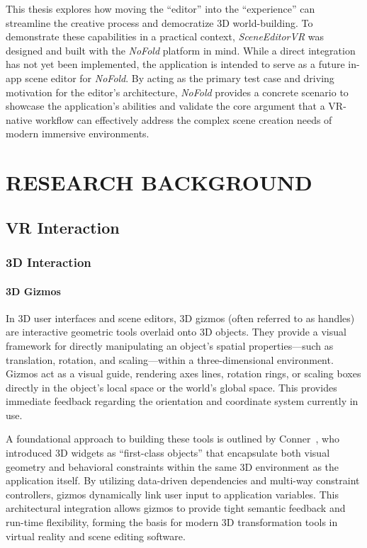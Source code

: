 \documentclass[inscr,ack,preface]{dithesis}
\begin{document}
This thesis explores how moving the ``editor'' into the ``experience'' can streamline the creative process and democratize 3D
world-building. To demonstrate these capabilities in a practical context, \textit{SceneEditorVR} was designed and built with the
\textit{NoFold} platform in mind. While a direct integration has not yet been implemented, the application is intended to serve as a
future in-app scene editor for \textit{NoFold}. By acting as the primary test case and driving motivation for the editor's
architecture, \textit{NoFold} provides a concrete scenario to showcase the application's abilities and validate the core
argument that a VR-native workflow can effectively address the complex scene creation needs of modern immersive environments.

\chapter{RESEARCH BACKGROUND}

\section{VR Interaction}

\subsection{3D Interaction}

\subsubsection{3D Gizmos}
In 3D user interfaces and scene editors, 3D gizmos (often referred to as handles) are interactive geometric tools overlaid onto 3D objects.
They provide a visual framework for directly manipulating an object’s spatial properties—such as translation, rotation, and scaling—within
a three-dimensional environment. Gizmos act as a visual guide, rendering axes lines, rotation rings, or scaling boxes directly in the
object's local space or the world's global space. This provides immediate feedback regarding the orientation and coordinate system currently
in use.

A foundational approach to building these tools is outlined by Conner~\cite{conner1992three},
who introduced 3D widgets as ``first-class objects'' that encapsulate both visual geometry and behavioral constraints
within the same 3D environment as the application itself. By utilizing data-driven dependencies and multi-way constraint controllers,
gizmos dynamically link user input to application variables. This architectural integration allows gizmos to provide tight semantic feedback
and run-time flexibility, forming the basis for modern 3D transformation tools in virtual reality and scene editing software.
\end{document}
